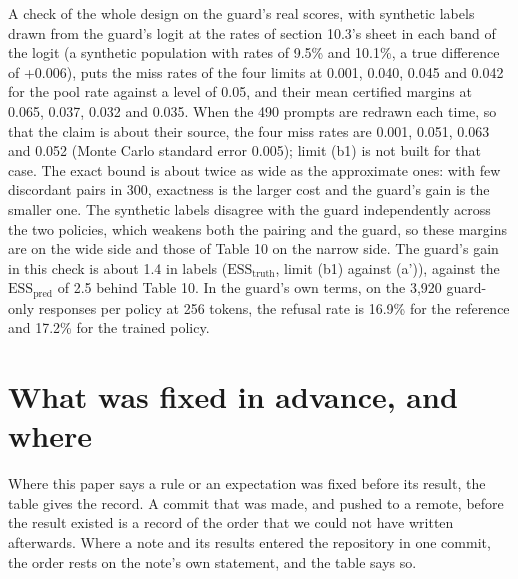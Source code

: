 \documentclass[11pt]{article}
\begin{document}
A check of the whole design on the guard's real scores, with synthetic labels drawn from the guard's logit at the rates of section 10.3's sheet in each band of the logit (a synthetic population with rates of 9.5\% and 10.1\%, a true difference of +0.006), puts the miss rates of the four limits at 0.001, 0.040, 0.045 and 0.042 for the pool rate against a level of 0.05, and their mean certified margins at 0.065, 0.037, 0.032 and 0.035. When the 490 prompts are redrawn each time, so that the claim is about their source, the four miss rates are 0.001, 0.051, 0.063 and 0.052 (Monte Carlo standard error 0.005); limit (b1) is not built for that case. The exact bound is about twice as wide as the approximate ones: with few discordant pairs in 300, exactness is the larger cost and the guard's gain is the smaller one. The synthetic labels disagree with the guard independently across the two policies, which weakens both the pairing and the guard, so these margins are on the wide side and those of Table 10 on the narrow side. The guard's gain in this check is about 1.4 in labels ($\mathrm{ESS}_{\mathrm{truth}}$, limit (b1) against (a')), against the $\mathrm{ESS}_{\mathrm{pred}}$ of 2.5 behind Table 10. In the guard's own terms, on the 3,920 guard-only responses per policy at 256 tokens, the refusal rate is 16.9\% for the reference and 17.2\% for the trained policy.


\section{What was fixed in advance, and where}

Where this paper says a rule or an expectation was fixed before its result, the table gives the record. A commit that was made, and pushed to a remote, before the result existed is a record of the order that we could not have written afterwards. Where a note and its results entered the repository in one commit, the order rests on the note's own statement, and the table says so.
\end{document}

